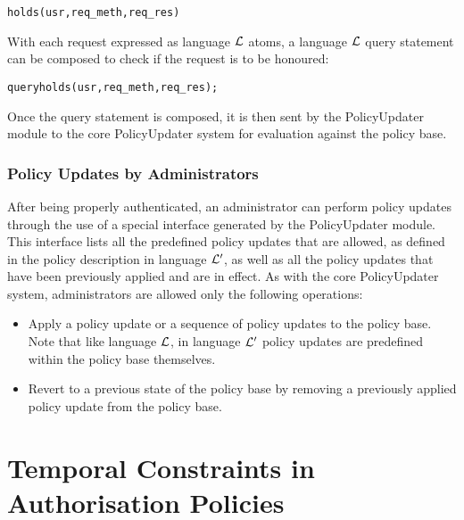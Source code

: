 \documentclass[11pt]{report}
\newenvironment{vverbatim}
{
  \begin{alltt}
}
{
    \vspace{-\baselineskip}
  \end{alltt}
}
\begin{document}
         \begin{vverbatim}
 holds(usr, req\_meth, req\_res)
         \end{vverbatim}

         With each request expressed as language ${\cal L}$ atoms, a language
         ${\cal L}$ query statement can be composed to check if the request is
         to be honoured:

         \begin{vverbatim}
 query holds(usr, req\_meth, req\_res);
         \end{vverbatim}

         Once the query statement is composed, it is then sent by the
         PolicyUpdater module to the core PolicyUpdater system for evaluation
         against the policy base.

      \subsection{Policy Updates by Administrators}
        \label{subs-polup-admin}

        After being properly authenticated, an administrator can perform policy
        updates through the use of a special interface generated by the
        PolicyUpdater module. This interface lists all the predefined policy
        updates that are allowed, as defined in the policy description in
        language ${\cal L'}$, as well as all the policy updates that have been
        previously applied and are in effect. As with the core PolicyUpdater
        system, administrators are allowed only the following operations:

        \begin{itemize}
          \item
            Apply a policy update or a sequence of policy updates to the policy
            base. Note that like language ${\cal L}$, in language ${\cal L'}$
            policy updates are predefined within the policy base themselves.
          \item
            Revert to a previous state of the policy base by removing a
            previously applied policy update from the policy base.
        \end{itemize}

  \chapter{Temporal Constraints in Authorisation Policies}
    \label{chap-tempo}
\end{document}
